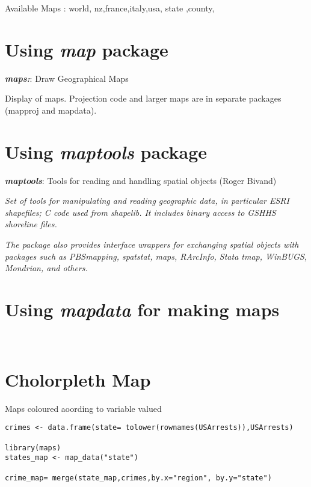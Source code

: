 \documentclass[12pt]{article}
\begin{document}
Available Maps : 
world, nz,france,italy,usa, state ,county,
%
\newpage
\section{Using \textit{map} package}
\textit{\textbf{maps:}}: Draw Geographical Maps

Display of maps. Projection code and larger maps are in separate packages (mapproj and mapdata).

%

\newpage
\section{Using \textit{maptools} package}
\textit{\textbf{maptools}}: Tools for reading and handling spatial objects (Roger Bivand)

\bigskip

\textit{Set of tools for manipulating and reading geographic data, in particular ESRI shapefiles; C code used from shapelib. It includes binary access to GSHHS shoreline files.}

\textit{The package also provides interface wrappers for exchanging spatial objects with packages such as PBSmapping, spatstat, maps, RArcInfo, Stata tmap, WinBUGS, Mondrian, and others.}
\newpage
\section{Using \textit{mapdata} for making maps}
\
\newpage
\section{Cholorpleth Map}
Maps coloured aoording to variable valued

\begin{framed}
\begin{verbatim}
crimes <- data.frame(state= tolower(rownames(USArrests)),USArrests)

library(maps)
states_map <- map_data("state")

crime_map= merge(state_map,crimes,by.x="region", by.y="state")
\end{verbatim}
\end{framed}
\end{document}

